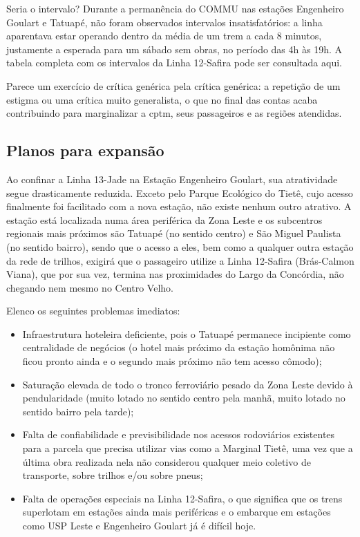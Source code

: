 \documentclass[11pt,fleqn]{book} %
\begin{document}
Seria o intervalo? Durante a permanência do COMMU nas estações Engenheiro Goulart e Tatuapé, não foram observados intervalos insatisfatórios: a linha aparentava estar operando dentro da média de um trem a cada 8 minutos, justamente a esperada para um sábado sem obras, no período das 4h às 19h. A tabela completa com os intervalos da Linha 12-Safira pode ser consultada aqui.


Parece um exercício de crítica genérica pela crítica genérica: a repetição de um estigma ou uma crítica muito generalista, o que no final das contas acaba contribuindo para marginalizar a \gls{cptm}, seus passageiros e as regiões atendidas.

\subsection{Planos para expansão}

Ao confinar a Linha 13-Jade na Estação Engenheiro Goulart, sua atratividade segue drasticamente reduzida. Exceto pelo Parque Ecológico do Tietê, cujo acesso finalmente foi facilitado com a nova estação, não existe nenhum outro atrativo. A estação está localizada numa área periférica da Zona Leste e os subcentros regionais mais próximos são Tatuapé (no sentido centro) e São Miguel Paulista (no sentido bairro), sendo que o acesso a eles, bem como a qualquer outra estação da rede de trilhos, exigirá que o passageiro utilize a Linha 12-Safira (Brás-Calmon Viana), que por sua vez, termina nas proximidades do Largo da Concórdia, não chegando nem mesmo no Centro Velho.

Elenco os seguintes problemas imediatos:

\begin{itemize}
	\item Infraestrutura hoteleira deficiente, pois o Tatuapé permanece incipiente como centralidade de negócios (o hotel mais próximo da estação homônima não ficou pronto ainda e o segundo mais próximo não tem acesso cômodo);
	\item Saturação elevada de todo o tronco ferroviário pesado da Zona Leste devido à pendularidade (muito lotado no sentido centro pela manhã, muito lotado no sentido bairro pela tarde);
	\item Falta de confiabilidade e previsibilidade nos acessos rodoviários existentes para a parcela que precisa utilizar vias como a Marginal Tietê, uma vez que a última obra realizada nela não considerou qualquer meio coletivo de transporte, sobre trilhos e/ou sobre pneus;
	\item Falta de operações especiais na Linha 12-Safira, o que significa que os trens superlotam em estações ainda mais periféricas e o embarque em estações como USP Leste e Engenheiro Goulart já é difícil hoje.
\end{itemize}
\end{document}
